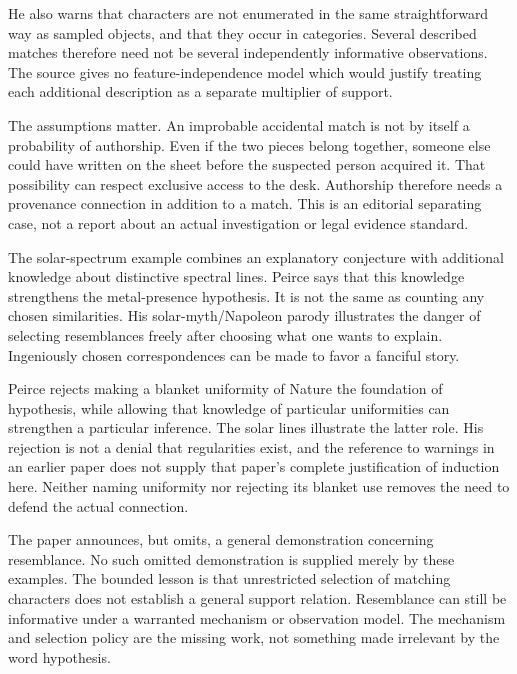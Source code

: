He also warns that characters are not enumerated in the same straightforward
way as sampled objects, and that they occur in categories. Several described
matches therefore need not be several independently informative observations.
The source gives no feature-independence model which would justify treating
each additional description as a separate multiplier of support.

The assumptions matter. An improbable accidental match is not by itself
a probability of authorship. Even if the two pieces belong together,
someone else could have written on the sheet before the suspected
person acquired it. That possibility can respect exclusive access to
the desk. Authorship therefore needs a provenance connection in addition
to a match. This is an editorial separating case, not a report about
an actual investigation or legal evidence standard.

The solar-spectrum example combines an explanatory conjecture with
additional knowledge about distinctive spectral lines. Peirce says that
this knowledge strengthens the metal-presence hypothesis. It is not the
same as counting any chosen similarities. His solar-myth/Napoleon parody
illustrates the danger of selecting resemblances freely after choosing
what one wants to explain. Ingeniously chosen correspondences can be
made to favor a fanciful story.

Peirce rejects making a blanket uniformity of Nature the foundation of
hypothesis, while allowing that knowledge of particular uniformities can
strengthen a particular inference. The solar lines illustrate the latter
role. His rejection is not a denial that regularities exist, and the
reference to warnings in an earlier paper does not supply that paper's
complete justification of induction here. Neither naming uniformity nor
rejecting its blanket use removes the need to defend the actual connection.

The paper announces, but omits, a general demonstration concerning
resemblance. No such omitted demonstration is supplied merely by these
examples. The bounded lesson is that unrestricted selection of matching
characters does not establish a general support relation. Resemblance
can still be informative under a warranted mechanism or observation
model. The mechanism and selection policy are the missing work, not
something made irrelevant by the word hypothesis.

